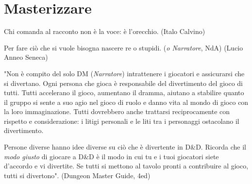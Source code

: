 \section{Masterizzare}

\label{masterizzare}

\begin{enfasi}{
Chi comanda al racconto non è la voce: è l'orecchio. (Italo Calvino)

\medskip

Per fare ciò che si vuole bisogna nascere re o stupidi. (\emph{o Narratore}, NdA) (Lucio Anneo Seneca)

\medskip



"Non è compito del solo DM (\emph{Narratore}) intrattenere i giocatori e assicurarsi che si divertano. Ogni persona che gioca è responsabile del divertimento del gioco di tutti. Tutti accelerano il gioco, aumentano il dramma, aiutano a stabilire quanto il gruppo si sente a suo agio nel gioco di ruolo e danno vita al mondo di gioco con la loro immaginazione. Tutti dovrebbero anche trattarsi reciprocamente con rispetto e considerazione: i litigi personali e le liti tra i personaggi ostacolano il divertimento.

Persone diverse hanno idee diverse su ciò che è divertente in D\&D. Ricorda che il \emph{modo giusto} di giocare a D\&D è il modo in cui tu e i tuoi giocatori siete d'accordo e vi divertite. Se tutti si mettono al tavolo pronti a contribuire al gioco, tutti si divertono". (Dungeon Master Guide, 4ed)

}\end{enfasi}


